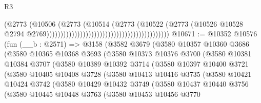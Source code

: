 \begin{lexlean}{R3}
\begin{coremodule}
                                                                            (@2773
                                                                              (@10506
                                                                                (@2773
                                                                                  (@10514
                                                                                    (@2773
                                                                                      (@10522
                                                                                        (@2773
                                                                                          (@10526
                                                                                            @10528
                                                                                            @2794
                                                                                            @2769))))))))))))))))))))))))))))))))))))))))))))
@10671 := @10352
    @10576
    (fun (__b : @2571) =>
    @3158
      (@3582
        @3679
        (@3580
          @10357
          @10360
          @3686
          (@3580
            @10365
            @10368
            @3693
            (@3580
              @10373
              @10376
              @3700
              (@3580
                @10381
                @10384
                @3707
                (@3580
                  @10389
                  @10392
                  @3714
                  (@3580
                    @10397
                    @10400
                    @3721
                    (@3580
                      @10405
                      @10408
                      @3728
                      (@3580
                        @10413
                        @10416
                        @3735
                        (@3580
                          @10421
                          @10424
                          @3742
                          (@3580
                            @10429
                            @10432
                            @3749
                            (@3580
                              @10437
                              @10440
                              @3756
                              (@3580
                                @10445
                                @10448
                                @3763
                                (@3580
                                  @10453
                                  @10456
                                  @3770

\end{coremodule}
\end{lexlean}
